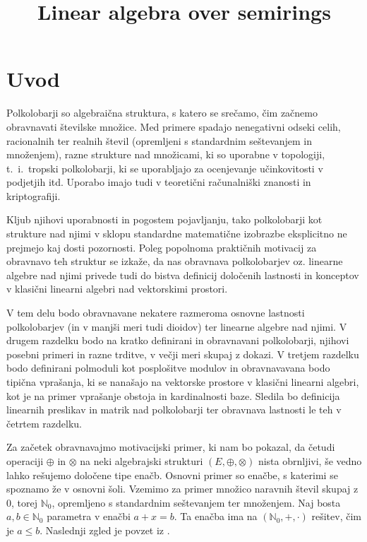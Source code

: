 \documentclass[mat1]{fmfdelo}
\title{Linear algebra over semirings}
\newcommand{\N}{\mathbb{N}}
\newcommand{\No}{\N_0}
\begin{document}

\tableofcontents

\section{Uvod}
Polkolobarji so algebraična struktura, s katero se srečamo, čim začnemo obravnavati številske množice. Med primere spadajo nenegativni odseki celih, racionalnih ter realnih števil (opremljeni s standardnim seštevanjem in množenjem), razne strukture nad množicami, ki so uporabne v topologiji, t.~i.~tropski polkolobarji, ki se uporabljajo za ocenjevanje učinkovitosti v podjetjih itd. Uporabo imajo tudi v teoretični računalniški znanosti in kriptografiji. 

Kljub njihovi uporabnosti in pogostem pojavljanju, tako polkolobarji kot strukture nad njimi v sklopu standardne matematične izobrazbe eksplicitno ne prejmejo kaj dosti pozornosti. Poleg popolnoma praktičnih motivacij za obravnavo teh struktur se izkaže, da nas obravnava polkolobarjev oz. linearne algebre nad njimi privede tudi do bistva definicij določenih lastnosti in konceptov v klasični linearni algebri nad vektorskimi prostori. 

V tem delu bodo obravnavane nekatere razmeroma osnovne lastnosti polkolobarjev (in v manjši meri tudi dioidov) ter linearne algebre nad njimi. V drugem razdelku bodo na kratko definirani in obravnavani polkolobarji, njihovi posebni primeri in razne trditve, v večji meri skupaj z dokazi. V tretjem razdelku bodo definirani polmoduli kot posplošitve modulov in obravnavavana bodo tipična vprašanja, ki se nanašajo na vektorske prostore v klasični linearni algebri, kot je na primer vprašanje obstoja in kardinalnosti baze. Sledila bo definicija linearnih preslikav in matrik nad polkolobarji ter obravnava lastnosti le teh v četrtem razdelku.

Za začetek obravnavajmo motivacijski primer, ki nam bo pokazal, da četudi operaciji $\oplus$ in $\otimes$ na neki algebrajski strukturi $(E, \oplus, \otimes)$ nista obrnljivi, še vedno lahko rešujemo določene tipe enačb. Osnovni primer so enačbe, s katerimi se spoznamo že v osnovni šoli. Vzemimo za primer množico naravnih števil skupaj z $0$, torej $\No$, opremljeno s standardnim seštevanjem ter množenjem. Naj bosta $a, b\in \No$ parametra v enačbi $a + x = b$. Ta enačba ima na $(\No, +, \cdot)$ rešitev, čim je $a \leq b$. Naslednji zgled je povzet iz \cite[str. 1 -- 2]{bib:Gondran}.
\end{document}

